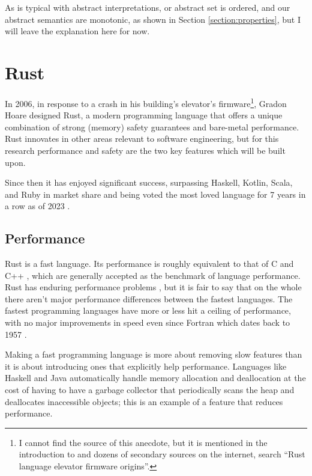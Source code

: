 \documentclass[12pt,twoside]{report}
\begin{document}
As is typical with abstract interpretations, or abstract set is ordered, and our abstract semantics are monotonic, as shown in Section \ref{section:properties}, but I will leave the explanation here for now.

\section{Rust}
In 2006, in response to a crash in his building's elevator's firmware\footnote{I cannot find the source of this anecdote, but it is mentioned in the introduction to \cite{aeneas} and dozens of secondary sources on the internet, search ``Rust language elevator firmware origins''.}, Gradon Hoare designed Rust, a modern programming language that offers a unique combination of strong (memory) safety guarantees and bare-metal performance. Rust innovates in other areas relevant to software engineering, but for this research performance and safety are the two key features which will be built upon.

Since then it has enjoyed significant success, surpassing Haskell, Kotlin, Scala, and Ruby in market share \citep{TIOBEIndex} and being voted the most loved language for 7 years in a row as of 2023 \cite{StackOverflowDeveloper}.

\subsection{Performance}
Rust is a fast language. Its performance is roughly equivalent to that of C and C++ \cite{BenchmarksGame}, which are generally accepted as the benchmark of language performance. Rust has enduring performance problems \cite{RustStackEfficiency2022}, but it is fair to say that on the whole there aren't major performance differences between the fastest languages. The fastest programming languages have more or less hit a ceiling of performance, with no major improvements in speed even since Fortran \citep{GccVsClassic} which dates back to 1957 \cite[p. 16]{wilsonComparativeProgrammingLanguages2001}.

Making a fast programming language is more about removing slow features than it is about introducing ones that explicitly help performance. Languages like Haskell and Java automatically handle memory allocation and deallocation at the cost of having to have a garbage collector that periodically scans the heap and deallocates inaccessible objects; this is an example of a feature that reduces performance.
\end{document}
